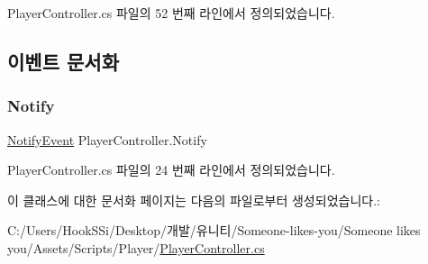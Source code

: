 Player\+Controller.\+cs 파일의 52 번째 라인에서 정의되었습니다.



\subsection{이벤트 문서화}
\mbox{\label{class_player_controller_af13292e01756741118500035511fc88d}} 
\subsubsection{\texorpdfstring{Notify}{Notify}}
{\footnotesize\ttfamily \mbox{\hyperlink{class_player_controller_a934c7f80b80276620cd60eaaeea7520e}{Notify\+Event}} Player\+Controller.\+Notify\hspace{0.3cm}{\ttfamily [static]}}



Player\+Controller.\+cs 파일의 24 번째 라인에서 정의되었습니다.



이 클래스에 대한 문서화 페이지는 다음의 파일로부터 생성되었습니다.\+:\begin{DoxyCompactItemize}
\item 
C\+:/\+Users/\+Hook\+S\+Si/\+Desktop/개발/유니티/\+Someone-\/likes-\/you/\+Someone likes you/\+Assets/\+Scripts/\+Player/\mbox{\hyperlink{_player_controller_8cs}{Player\+Controller.\+cs}}\end{DoxyCompactItemize}
